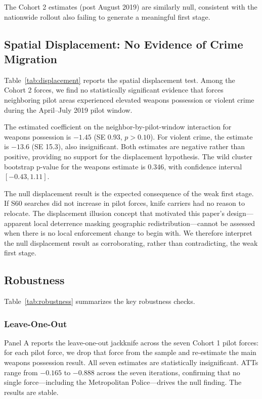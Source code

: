 \documentclass[12pt]{article}
\begin{document}
The Cohort 2 estimates (post August 2019) are similarly null, consistent with the nationwide rollout also failing to generate a meaningful first stage.

\subsection{Spatial Displacement: No Evidence of Crime Migration}

Table~\ref{tab:displacement} reports the spatial displacement test. Among the Cohort 2 forces, we find no statistically significant evidence that forces neighboring pilot areas experienced elevated weapons possession or violent crime during the April--July 2019 pilot window.



The estimated coefficient on the neighbor-by-pilot-window interaction for weapons possession is $-1.45$ (SE 0.93, $p > 0.10$). For violent crime, the estimate is $-13.6$ (SE 15.3), also insignificant. Both estimates are negative rather than positive, providing no support for the displacement hypothesis. The wild cluster bootstrap p-value for the weapons estimate is 0.346, with confidence interval $[-0.43, 1.11]$.

The null displacement result is the expected consequence of the weak first stage. If S60 searches did not increase in pilot forces, knife carriers had no reason to relocate. The displacement illusion concept that motivated this paper's design---apparent local deterrence masking geographic redistribution---cannot be assessed when there is no local enforcement change to begin with. We therefore interpret the null displacement result as corroborating, rather than contradicting, the weak first stage.

\subsection{Robustness}

Table~\ref{tab:robustness} summarizes the key robustness checks.



\subsubsection*{Leave-One-Out}

Panel A reports the leave-one-out jackknife across the seven Cohort 1 pilot forces: for each pilot force, we drop that force from the sample and re-estimate the main weapons possession result. All seven estimates are statistically insignificant. ATTs range from $-0.165$ to $-0.888$ across the seven iterations, confirming that no single force---including the Metropolitan Police---drives the null finding. The results are stable.
\end{document}
